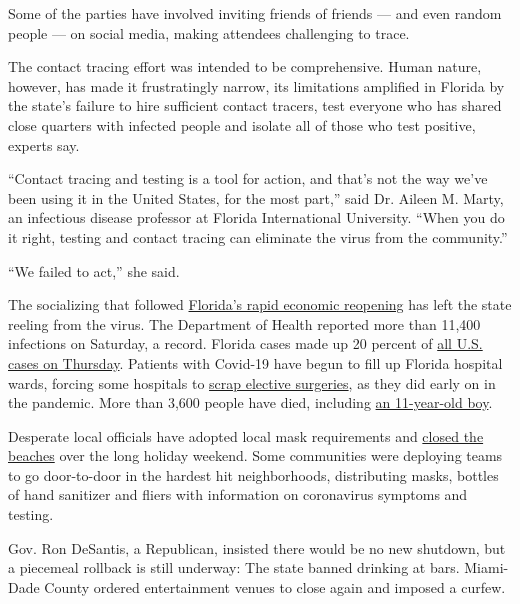Some of the parties have involved inviting friends of friends --- and
even random people --- on social media, making attendees challenging to
trace.

The contact tracing effort was intended to be comprehensive. Human
nature, however, has made it frustratingly narrow, its limitations
amplified in Florida by the state's failure to hire sufficient contact
tracers, test everyone who has shared close quarters with infected
people and isolate all of those who test positive, experts say.

``Contact tracing and testing is a tool for action, and that's not the
way we've been using it in the United States, for the most part,'' said
Dr. Aileen M. Marty, an infectious disease professor at Florida
International University. ``When you do it right, testing and contact
tracing can eliminate the virus from the community.''

``We failed to act,'' she said.

The socializing that followed
\href{https://www.nytimes.com/2020/06/26/nyregion/florida-coronavirus-ny.html}{Florida's
rapid economic reopening} has left the state reeling from the virus. The
Department of Health reported more than 11,400 infections on Saturday, a
record. Florida cases made up 20 percent of
\href{https://www.nytimes.com/2020/07/02/world/coronavirus-us.html?action=click\&module=Top\%20Stories\&pgtype=Homepage}{all
U.S. cases on Thursday}. Patients with Covid-19 have begun to fill up
Florida hospital wards, forcing some hospitals to
\href{https://www.nytimes.com/2020/07/01/world/coronavirus-updates.html}{scrap
elective surgeries}, as they did early on in the pandemic. More than
3,600 people have died, including
\href{https://www.miamiherald.com/news/coronavirus/article243959612.html}{an
11-year-old boy}.

Desperate local officials have adopted local mask requirements and
\href{https://www.nytimes.com/2020/07/02/us/coronavirus-fourth-of-july.html}{closed
the beaches} over the long holiday weekend. Some communities were
deploying teams to go door-to-door in the hardest hit neighborhoods,
distributing masks, bottles of hand sanitizer and fliers with
information on coronavirus symptoms and testing.

Gov. Ron DeSantis, a Republican, insisted there would be no new
shutdown, but a piecemeal rollback is still underway: The state banned
drinking at bars. Miami-Dade County ordered entertainment venues to
close again and imposed a curfew.

